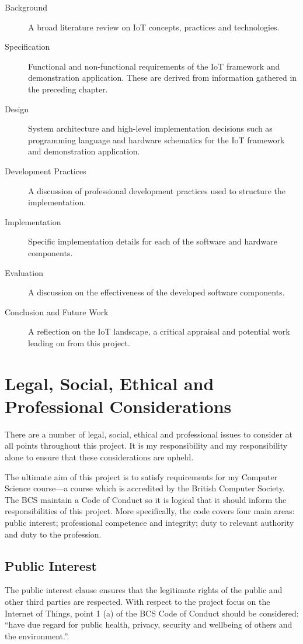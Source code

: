     \begin{description}
      \item[Background] A broad literature review on IoT concepts, practices and technologies.
      \item[Specification] Functional and non-functional requirements of the IoT framework and demonstration application. These are derived from information gathered in the preceding chapter.
      \item[Design] System architecture and high-level implementation decisions such as programming language and hardware schematics for the IoT framework and demonstration application.
      \item[Development Practices] A discussion of professional development practices used to structure the implementation.
      \item[Implementation] Specific implementation details for each of the software and hardware components.
      \item[Evaluation] A discussion on the effectiveness of the developed software components.
      \item[Conclusion and Future Work] A reflection on the IoT landscape, a critical appraisal and potential work leading on from this project.

    \end{description}

  \section{Legal, Social, Ethical and Professional Considerations}
  \label{chapter:profession-considerations}
    There are a number of legal, social, ethical and professional issues to consider at all points throughout this project. It is my responsibility and my responsibility alone to ensure that these considerations are upheld.

    The ultimate aim of this project is to satisfy requirements for my Computer Science course---a course which is accredited by the British Computer Society. The BCS maintain a Code of Conduct \citep{bcs-coc} so it is logical that it should inform the responsibilities of this project. More specifically, the code covers four main areas: public interest; professional competence and integrity; duty to relevant authority and duty to the profession.

    \subsection{Public Interest}
      The public interest clause ensures that the legitimate rights of the public and other third parties are respected. With respect to the project focus on the Internet of Things, point 1 (a) of the BCS Code of Conduct should be considered: ``have due regard for public health, privacy, security and wellbeing of others and the environment.''.

